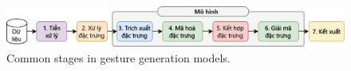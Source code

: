 

\begin{figure}[t]
	\centering
	\includegraphics[width=\linewidth]{images/CommonStage.png}
	\caption{Common stages in gesture generation models.}
	\Description{}
	\label{fig:CommonStage}
\end{figure}

